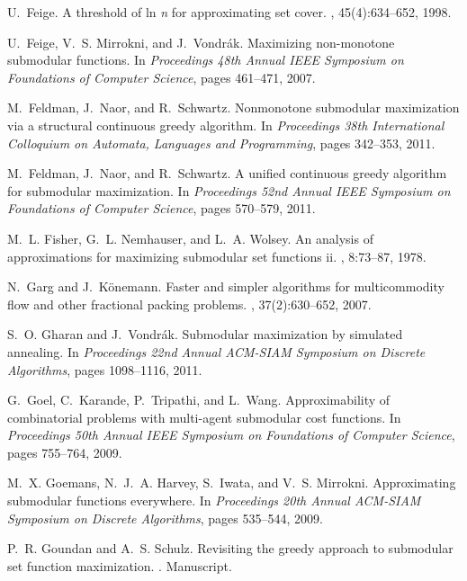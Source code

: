 \documentclass[11pt]{article}
\theoremstyle{plain}
\theoremstyle{definition}
\begin{document}
\begin{thebibliography}{10}
U.~Feige.
\newblock A threshold of ln {\it n} for approximating set cover.
, 45(4):634--652, 1998.

U.~Feige, V.~S. Mirrokni, and J.~Vondr{\'a}k.
\newblock Maximizing non-monotone submodular functions.
\newblock In {\em Proceedings 48th Annual IEEE Symposium on Foundations of
  Computer Science}, pages 461--471, 2007.

M.~Feldman, J.~Naor, and R.~Schwartz.
\newblock Nonmonotone submodular maximization via a structural continuous
  greedy algorithm.
\newblock In {\em Proceedings 38th International Colloquium on Automata,
  Languages and Programming}, pages 342--353, 2011.

M.~Feldman, J.~Naor, and R.~Schwartz.
\newblock A unified continuous greedy algorithm for submodular maximization.
\newblock In {\em Proceedings 52nd Annual IEEE Symposium on Foundations of
  Computer Science}, pages 570--579, 2011.

M.~L. Fisher, G.~L. Nemhauser, and L.~A. Wolsey.
\newblock An analysis of approximations for maximizing submodular set functions
  {\sc ii}.
, 8:73--87, 1978.

N.~Garg and J.~K{\"o}nemann.
\newblock Faster and simpler algorithms for multicommodity flow and other
  fractional packing problems.
, 37(2):630--652, 2007.

S.~O. Gharan and J.~Vondr{\'a}k.
\newblock Submodular maximization by simulated annealing.
\newblock In {\em Proceedings 22nd Annual ACM-SIAM Symposium on Discrete
  Algorithms}, pages 1098--1116, 2011.

G.~Goel, C.~Karande, P.~Tripathi, and L.~Wang.
\newblock Approximability of combinatorial problems with multi-agent submodular
  cost functions.
\newblock In {\em Proceedings 50th Annual IEEE Symposium on Foundations of
  Computer Science}, pages 755--764, 2009.

M.~X. Goemans, N.~J.~A. Harvey, S.~Iwata, and V.~S. Mirrokni.
\newblock Approximating submodular functions everywhere.
\newblock In {\em Proceedings 20th Annual ACM-SIAM Symposium on Discrete
  Algorithms}, pages 535--544, 2009.

P.~R. Goundan and A.~S. Schulz.
\newblock Revisiting the greedy approach to submodular set function
  maximization.
.
\newblock Manuscript.


\end{thebibliography}
\end{document}
